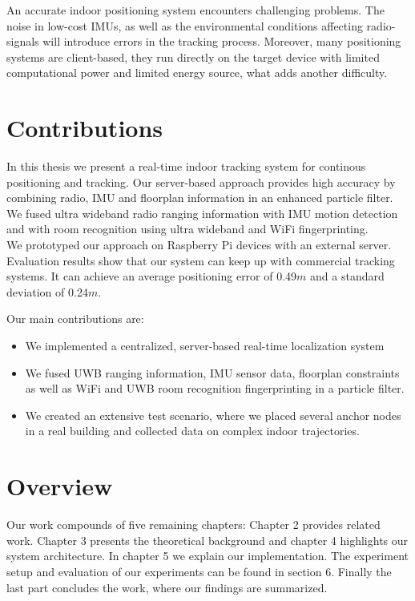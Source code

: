 \noindent\hspace*{5mm}%
An accurate indoor positioning system encounters challenging problems. The noise in low-cost IMUs, as well as the environmental conditions affecting radio-signals will introduce errors in the tracking process. Moreover, many positioning systems are client-based, they run directly on the target device with limited computational power and limited energy source, what adds another difficulty.



\section{Contributions}

In this thesis we present a real-time indoor tracking system for continous positioning and tracking. Our server-based approach provides high accuracy by combining radio, IMU and floorplan information in an enhanced particle filter. We fused ultra wideband radio ranging information with IMU motion detection and with room recognition using ultra wideband and WiFi fingerprinting. \\
\noindent\hspace*{5mm}%
We prototyped our approach on Raspberry Pi devices with an external server.
Evaluation results show that our system can keep up with commercial tracking systems. It can achieve an average positioning error of 0.49$m$ and a standard deviation of 0.24$m$.

Our main contributions are:
\begin{itemize}
\item We implemented a centralized, server-based real-time localization system
\item We fused UWB ranging information, IMU sensor data, floorplan constraints as well as WiFi and UWB room recognition fingerprinting in a particle filter. 
\item We created an extensive test scenario, where we placed several anchor nodes in a real building and collected data on complex indoor trajectories. 
\end{itemize}




\section{Overview}

Our work compounds of five remaining chapters:
Chapter 2 provides related work. Chapter 3 presents the theoretical background and chapter 4 highlights our system architecture. In chapter 5 we explain our implementation. The experiment setup and evaluation of our experiments can be found in section 6. Finally the last part concludes the work, where our findings are summarized.